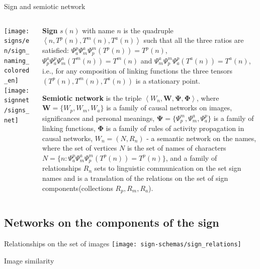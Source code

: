 \documentclass[default]{beamer}
\begin{document}
	\begin{frame}{Sign and semiotic network}
		
		\begin{columns}
			\begin{column}{0.4\textwidth}
				\begin{center}
					\texttt{[image: signs/en/sign\_naming\_colored\_en]}
					\texttt{[image: signnet/signs\_net]}
					
				\end{center}
			\end{column}
			\begin{column}{0.6\textwidth}
				\scriptsize
				\textbf{Sign} $s(n)$ with name $n$ is the quadruple $\left\langle n,{{T}^{p}}(n),{{T}^{m}}(n),{{T}^{a}}(n) \right\rangle $ such that all the three ratios are satisfied: $\Psi _{a}^{p}\Psi _{m}^{a}\Psi _{p}^{m}({{T}^{p}}(n))={{T}^{p}}(n)$, $\Psi _{p}^{a}\Psi _{a}^{p}\Psi _{m}^{a}({{T}^{m}}(n))={{T}^{m}}(n)$ and $\Psi _{m}^{a}\Psi _{p}^{m}\Psi _{a}^{p}({{T}^{a}}(n))={{T}^{a}}(n)$, i.e., for any composition of linking functions the three tensors $({{T}^{p}}(n),{{T}^{m}}(n),{{T}^{a}}(n))$ is a stationary point.
				\par\medskip
				\textbf{Semiotic network} is the triple $\left\langle {{W}_{n}},\mathbf{W},\mathbf{\Psi },\mathbf{\Phi } \right\rangle $, where $\mathbf{W}=\{{{W}_{p}},{{W}_{m}},{{W}_{a}}\}$ is a family of causal networks on images, significances and personal meanings, $\mathbf{\Psi }=\{\Psi _{p}^{m},\Psi _{m}^{a},\Psi _{a}^{p}\}$ is a family of linking functions, $\mathbf{\Phi } $ is a family of rules of activity propagation in causal networks, ${{W}_{n}}=(N,{{R}_{n}})$ - a semantic network on the names, where the set of vertices $N$ is the set of names of characters $N=\{n:\Psi _{a}^{p}\Psi _{m}^{a}\Psi _{p}^{m}({{T}^{p}}(n))={{T}^{p}}(n)\}$, and a family of relationships ${{R}_{n}}$ sets to linguistic communication on the set sign names and is a translation of the relations on the set of sign components(collections ${{R}_{p}},{{R}_{m}},{{R}_{a}}$).
			\end{column}
		\end{columns}
		\nocite{*}
		\printbibliography[keyword={symbsign}, resetnumbers=true]
	\end{frame}
	\subsection{Networks on the components of the sign}
		\begin{frame}{Relationships on the set of images}
			\centering
			\texttt{[image: sign-schemas/sign\_relations]}
			
			Image similarity
		\end{frame}	
		
\end{document}
